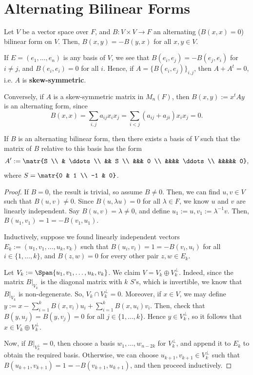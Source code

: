 \section{Alternating Bilinear Forms}

Let $V$ be a vector space over $F$, and $B:V \times V \to F$ an alternating ($B(x,x)=0$) bilinear form on $V$. Then, $B(x,y) = -B(y,x)$ for all $x,y \in V$.

If $E=(e_1,\dots,e_n)$ is any basis of $V$, we see that $B(e_i,e_j) = - B(e_j,e_i)$ for $i \neq j$, and $B(e_i,e_i)=0$ for all $i$. Hence, if $A = \{ B(e_i,e_j)\}_{i,j}$, then $A + A^t=0$, i.e. $A$ is \textbf{skew-symmetric}.

Conversely, if $A$ is a skew-symmetric matrix in $M_n(F)$, then $B(x,y):= x^tAy$ is an alternating form, since
$$B(x,x) = \sum_{i,j} a_{ij}x_ix_j= \sum_{i <j}(a_{ij}+a_{ji})x_ix_j=0.$$

\begin{thm}
    If $B$ is an alternating bilinear form, then there exists a basis of $V$ such that the matrix of $B$ relative to this basis has the form
    $$A':= \matr{S \\ & \ddots \\ && S \\ &&& 0 \\ &&&& \ddots \\ &&&&& 0},$$
    where $S= \matr{0 & 1 \\ -1 & 0}$.
\end{thm}

\begin{proof}
    If $B=0$, the result is trivial, so assume $B \neq 0$. Then, we can find $u,v \in V$ such that $B(u,v) \neq 0$. Since $B(u, \lambda u)=0$ for all $\lambda \in F$, we know $u$ and $v$ are linearly independent. Say $B(u,v) = \lambda \neq 0$, and define $u_1:=u,v_1 := \lambda^{-1}v$. Then, $B(u_1,v_1) = 1 = -B(v_1,u_1)$.

    Inductively, suppose we found linearly independent vectors $E_k:= (u_1,v_1,\dots,u_k,v_k)$ such that $B(u_i, v_i)= 1 = -B(v_i,u_i)$ for all $i \in \{1,\dots,k\}$, and $B(z,w)=0$ for every other pair $z,w \in E_k$.

    Let $V_k:= \Span \{ u_1,v_1,\dots,u_k,v_k\}$. We claim $V = V_k \oplus V_k^\perp$. Indeed, since the matrix $B|_{V_k}$ is the diagonal matrix with $k$ $S$'s, which is invertible, we know that $B|_{V_k}$ is non-degenerate. So, $V_k \cap V_k^\perp =0$. Moreover, if $x \in V$, we may define $y := x- \sum_{i=1}^kB(x,v_i)u_i + \sum_{i=1}^kB(x,u_i)v_i$. Then, check that $B(y,u_j)=B(y,v_j)=0$ for all $j \in \{1,\dots,k\}$. Hence $y \in V_k^\perp$, so it follows that $x \in  V_k \oplus V_k^\perp$.

    Now, if $B|_{V_k^\perp}=0$, then choose a basis $w_1,\dots,w_{n-2k}$ for $V_k^\perp$, and append it to $E_k$ to obtain the required basis. Otherwise, we can choose $u_{k+1},v_{k+1} \in V_k^\perp$ such that $B(u_{k+1},v_{k+1})=1 = -B(v_{k+1},u_{k+1})$, and then proceed inductively.
\end{proof}

